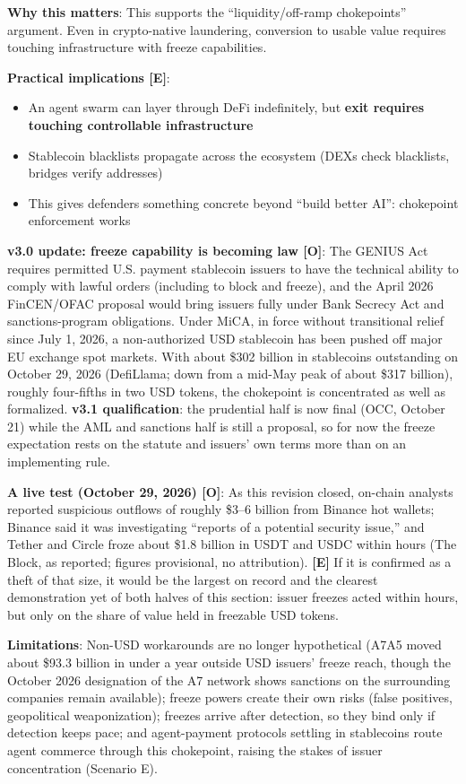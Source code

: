 \documentclass[11pt,letterpaper]{article}
\begin{document}
\textbf{Why this matters}: This supports the ``liquidity/off-ramp chokepoints'' argument. Even in crypto-native laundering, conversion to usable value requires touching infrastructure with freeze capabilities.

\textbf{Practical implications [E]}:
\begin{itemize}
  \item An agent swarm can layer through DeFi indefinitely, but \textbf{exit requires touching controllable infrastructure}
  \item Stablecoin blacklists propagate across the ecosystem (DEXs check blacklists, bridges verify addresses)
  \item This gives defenders something concrete beyond ``build better AI'': chokepoint enforcement works
\end{itemize}

\textbf{v3.0 update: freeze capability is becoming law [O]}: The GENIUS Act requires permitted U.S. payment stablecoin issuers to have the technical ability to comply with lawful orders (including to block and freeze), and the April 2026 FinCEN/OFAC proposal would bring issuers fully under Bank Secrecy Act and sanctions-program obligations. Under MiCA, in force without transitional relief since July 1, 2026, a non-authorized USD stablecoin has been pushed off major EU exchange spot markets. With about \$302 billion in stablecoins outstanding on October 29, 2026 (DefiLlama; down from a mid-May peak of about \$317 billion), roughly four-fifths in two USD tokens, the chokepoint is concentrated as well as formalized. \textbf{v3.1 qualification}: the prudential half is now final (OCC, October 21) while the AML and sanctions half is still a proposal, so for now the freeze expectation rests on the statute and issuers' own terms more than on an implementing rule.

\textbf{A live test (October 29, 2026) [O]}: As this revision closed, on-chain analysts reported suspicious outflows of roughly \$3--6 billion from Binance hot wallets; Binance said it was investigating ``reports of a potential security issue,'' and Tether and Circle froze about \$1.8 billion in USDT and USDC within hours (The Block, as reported; figures provisional, no attribution). \textbf{[E]} If it is confirmed as a theft of that size, it would be the largest on record and the clearest demonstration yet of both halves of this section: issuer freezes acted within hours, but only on the share of value held in freezable USD tokens.

\textbf{Limitations}: Non-USD workarounds are no longer hypothetical (A7A5 moved about \$93.3 billion in under a year outside USD issuers' freeze reach, though the October 2026 designation of the A7 network shows sanctions on the surrounding companies remain available); freeze powers create their own risks (false positives, geopolitical weaponization); freezes arrive after detection, so they bind only if detection keeps pace; and agent-payment protocols settling in stablecoins route agent commerce through this chokepoint, raising the stakes of issuer concentration (Scenario E).
\end{document}
